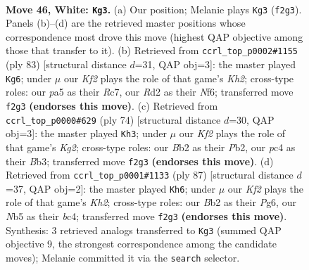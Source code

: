 \documentclass[11pt]{article}
\begin{document}
\clearpage

\begin{figure}[p]\centering
\begin{subfigure}{0.46\textwidth}\centering
\resizebox{\linewidth}{!}{%
\newchessgame
\chessboard[
  setfen={8/1p2pk2/n5pp/pN6/2p4r/2P2P2/PB1R1K2/8 w - - 0 46},
  showmover=false,
  pgfstyle=straightmove, color=movearrow, markmove={f2-g3}
]}
\caption{}
\end{subfigure}\hfill
\begin{subfigure}{0.46\textwidth}\centering
\resizebox{\linewidth}{!}{%
\newchessgame
\chessboard[
  setfen={8/2r3pk/p4n2/N1p4p/2P5/P2R2PP/6K1/8 b - - 2 42},
  showmover=false,
  pgfstyle=straightmove, color=movearrow, markmove={h7-g6}
]}
\caption{}
\end{subfigure}
\\[4pt]
\begin{subfigure}{0.46\textwidth}\centering
\resizebox{\linewidth}{!}{%
\newchessgame
\chessboard[
  setfen={8/p7/2nr2pk/1p5p/7P/1B4P1/PP2R1K1/8 w - - 0 38},
  showmover=false,
  pgfstyle=straightmove, color=movearrow, markmove={g2-h3}
]}
\caption{}
\end{subfigure}\hfill
\begin{subfigure}{0.46\textwidth}\centering
\resizebox{\linewidth}{!}{%
\newchessgame
\chessboard[
  setfen={8/6rk/2P3p1/p1P5/2B1p2p/6bP/P5P1/6RK b - - 1 44},
  showmover=false,
  pgfstyle=straightmove, color=movearrow, markmove={h7-h6}
]}
\caption{}
\end{subfigure}
\caption{\textbf{Move 46, White: \texttt{Kg3}.} (a) Our position; Melanie plays \texttt{Kg3} (\texttt{f2g3}). Panels (b)--(d) are the retrieved master positions whose correspondence most drove this move (highest QAP objective among those that transfer to it). (b) Retrieved from \texttt{ccrl\_top\_p0002\#1155} (ply 83) [structural distance $d$=31, QAP obj=3]: the master played \texttt{Kg6}; under $\mu$ our \emph{Kf2} plays the role of that game's \emph{Kh2}; cross-type roles: our \emph{p}a5 as their \emph{R}c7, our \emph{R}d2 as their \emph{N}f6; transferred move \texttt{f2g3} \textbf{(endorses this move)}. (c) Retrieved from \texttt{ccrl\_top\_p0000\#629} (ply 74) [structural distance $d$=30, QAP obj=3]: the master played \texttt{Kh3}; under $\mu$ our \emph{Kf2} plays the role of that game's \emph{Kg2}; cross-type roles: our \emph{B}b2 as their \emph{P}b2, our \emph{p}c4 as their \emph{B}b3; transferred move \texttt{f2g3} \textbf{(endorses this move)}. (d) Retrieved from \texttt{ccrl\_top\_p0001\#1133} (ply 87) [structural distance $d$=37, QAP obj=2]: the master played \texttt{Kh6}; under $\mu$ our \emph{Kf2} plays the role of that game's \emph{Kh2}; cross-type roles: our \emph{B}b2 as their \emph{P}g6, our \emph{N}b5 as their \emph{b}c4; transferred move \texttt{f2g3} \textbf{(endorses this move)}. Synthesis: 3 retrieved analogs transferred to \texttt{Kg3} (summed QAP objective 9, the strongest correspondence among the candidate moves); Melanie committed it via the \texttt{search} selector.}
\label{fig:thought-m90}
\end{figure}
\end{document}

